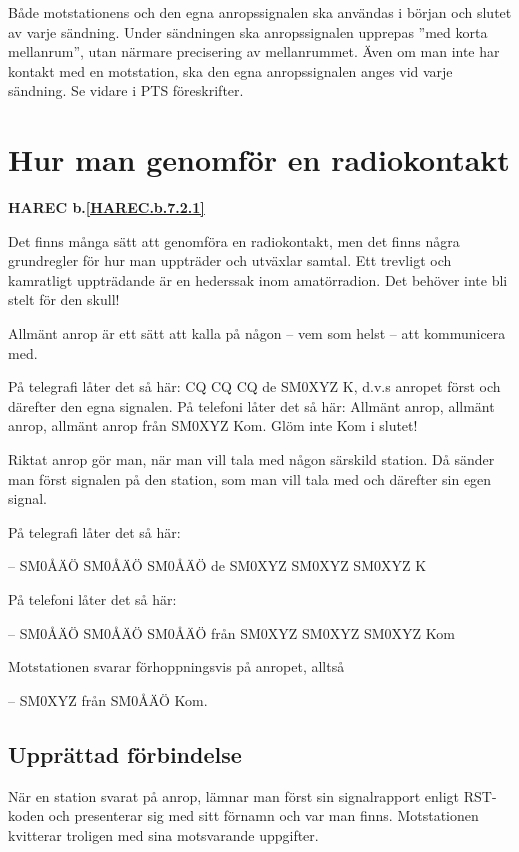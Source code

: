 Både motstationens och den egna anropssignalen ska användas i början
och slutet av varje sändning. Under sändningen ska anropssignalen
upprepas ''med korta mellanrum'', utan närmare precisering av
mellanrummet. Även om man inte har kontakt med en motstation, ska
den egna anropssignalen anges vid varje sändning. Se vidare i PTS
föreskrifter.


\section{Hur man genomför en radiokontakt}
\textbf{HAREC
  b.\ref{HAREC.b.7.2.1}\label{myHAREC.b.7.2.1}
}

Det finns många sätt att genomföra en radiokontakt, men det finns
några grundregler för hur man uppträder och utväxlar samtal. Ett
trevligt och kamratligt uppträdande är en hederssak inom
amatörradion. Det behöver inte bli stelt för den skull!

Allmänt anrop är ett sätt att kalla på någon
-- vem som helst -- att kommunicera med.

På telegrafi låter det så här: CQ CQ CQ de SM0XYZ K, d.v.s anropet
först och därefter den egna signalen. På telefoni låter det så här:
Allmänt anrop, allmänt anrop, allmänt anrop från SM0XYZ Kom. Glöm inte
Kom i slutet!

Riktat anrop gör man, när man vill tala med någon särskild station. Då
sänder man först signalen på den station, som man vill tala med och
därefter sin egen signal.

På telegrafi låter det så här:

-- SM0ÅÄÖ SM0ÅÄÖ SM0ÅÄÖ de SM0XYZ SM0XYZ SM0XYZ K

På telefoni låter det så här:

-- SM0ÅÄÖ SM0ÅÄÖ SM0ÅÄÖ från SM0XYZ SM0XYZ SM0XYZ Kom

Motstationen svarar förhoppningsvis på anropet, alltså

-- SM0XYZ från SM0ÅÄÖ Kom.

\subsection{Upprättad förbindelse}

När en station svarat på anrop, lämnar man först sin signalrapport
enligt RST-koden och presenterar sig med sitt förnamn och var man
finns. Motstationen kvitterar troligen med sina motsvarande
uppgifter.

